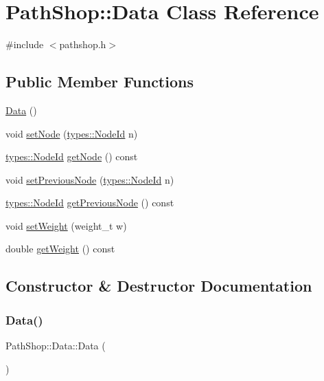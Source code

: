 \hypertarget{class_path_shop_1_1_data}{}\section{Path\+Shop\+::Data Class Reference}
\label{class_path_shop_1_1_data}


{\ttfamily \#include $<$pathshop.\+h$>$}

\subsection*{Public Member Functions}
\begin{DoxyCompactItemize}
\item 
\mbox{\hyperlink{class_path_shop_1_1_data_acd1b01e1b6f5391e9bb109b61ea327f5}{Data}} ()
\item 
void \mbox{\hyperlink{class_path_shop_1_1_data_a8fedcc40d393d9a1d183d76823c12e9a}{set\+Node}} (\mbox{\hyperlink{classtypes_1_1_node_id}{types\+::\+Node\+Id}} n)
\item 
\mbox{\hyperlink{classtypes_1_1_node_id}{types\+::\+Node\+Id}} \mbox{\hyperlink{class_path_shop_1_1_data_adcbc8d9a7b74be95e14f57e335efa344}{get\+Node}} () const
\item 
void \mbox{\hyperlink{class_path_shop_1_1_data_ae22b6cbcec8d11fc9f493fd46e4aca3f}{set\+Previous\+Node}} (\mbox{\hyperlink{classtypes_1_1_node_id}{types\+::\+Node\+Id}} n)
\item 
\mbox{\hyperlink{classtypes_1_1_node_id}{types\+::\+Node\+Id}} \mbox{\hyperlink{class_path_shop_1_1_data_aa6663bf08ea363b72f49bfbcd438615e}{get\+Previous\+Node}} () const
\item 
void \mbox{\hyperlink{class_path_shop_1_1_data_af7cd2a665f5243598f9ec57cfecb583c}{set\+Weight}} (weight\+\_\+t w)
\item 
double \mbox{\hyperlink{class_path_shop_1_1_data_af776565ad2dae76c466c3f0fd020164b}{get\+Weight}} () const
\end{DoxyCompactItemize}


\subsection{Constructor \& Destructor Documentation}
\mbox{\label{class_path_shop_1_1_data_acd1b01e1b6f5391e9bb109b61ea327f5}} 
\subsubsection{\texorpdfstring{Data()}{Data()}}
{\footnotesize\ttfamily Path\+Shop\+::\+Data\+::\+Data (\begin{DoxyParamCaption}{ }\end{DoxyParamCaption})\hspace{0.3cm}{\ttfamily [inline]}}



